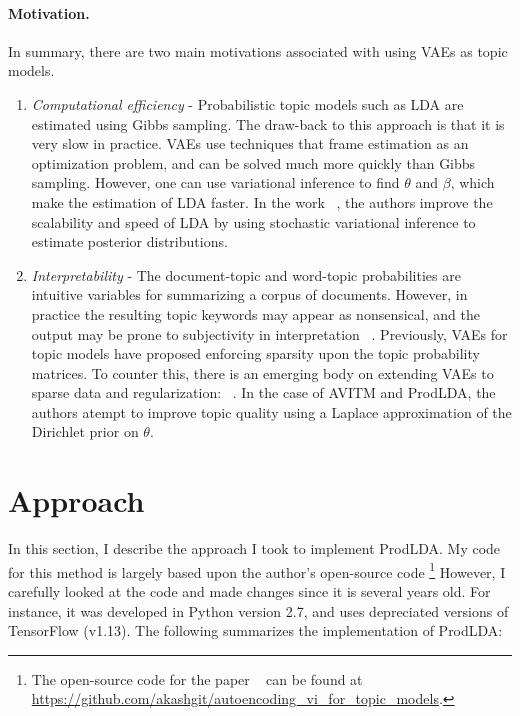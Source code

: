 \documentclass[10pt,twocolumn,letterpaper]{article}
\begin{document}
\paragraph{Motivation.}
In summary, there are two main motivations associated with using VAEs as topic models.
\begin{enumerate}\itemsep0pt
    \item \textit{Computational efficiency} - Probabilistic topic models such as LDA are estimated using Gibbs sampling. 
    The draw-back to this approach is that it is very slow in practice. 
    VAEs use techniques that frame estimation as an optimization problem, and can be solved much more quickly than Gibbs sampling.
    However, one can use variational inference to find $\theta$ and $\beta$, which make the estimation of LDA faster.
    In the work ~\cite{hoffman2013stochastic}, the authors improve the scalability and speed of LDA by using stochastic variational inference to estimate posterior distributions. 
    \item \textit{Interpretability} - 
    The document-topic and word-topic probabilities are intuitive variables for summarizing a corpus of documents. 
    However, in practice the resulting topic keywords may appear as nonsensical, and the output may be prone to subjectivity in interpretation ~\cite{chang2009reading}. 
    Previously, VAEs for topic models have proposed enforcing sparsity upon the topic probability matrices. 
    To counter this, there is an emerging body on extending VAEs to sparse data and regularization: ~\cite{antelmi2019sparse,dai2018connections,zhao2019variational}. 
    In the case of AVITM and ProdLDA, the authors atempt to improve topic quality using a Laplace approximation of the Dirichlet prior on $\theta$.
\end{enumerate}



\section{Approach}
In this section, I describe the approach I took to implement ProdLDA.
My code for this method is largely based upon the author's open-source code \footnote{The open-source code for the paper ~\cite{srivastava2017autoencoding} can be found at \url{https://github.com/akashgit/autoencoding_vi_for_topic_models}.} 
However, I carefully looked at the code and made changes since it is several years old.
For instance, it was developed in Python version 2.7, and uses depreciated versions of TensorFlow (v1.13).
The following summarizes the implementation of ProdLDA: 
\end{document}
